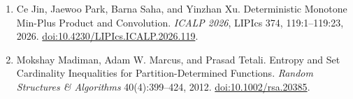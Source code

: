 \begin{enumerate}
\item
  Ce Jin, Jaewoo Park, Barna Saha, and Yinzhan Xu. Deterministic Monotone Min-Plus Product and Convolution. \emph{ICALP 2026}, LIPIcs 374, 119:1--119:23, 2026. \href{https://drops.dagstuhl.de/entities/document/10.4230/LIPIcs.ICALP.2026.119}{doi:10.4230/LIPIcs.ICALP.2026.119}.
\item
  Mokshay Madiman, Adam W. Marcus, and Prasad Tetali. Entropy and Set Cardinality Inequalities for Partition-Determined Functions. \emph{Random Structures \& Algorithms} 40(4):399--424, 2012. \href{https://doi.org/10.1002/rsa.20385}{doi:10.1002/rsa.20385}.
\end{enumerate}
